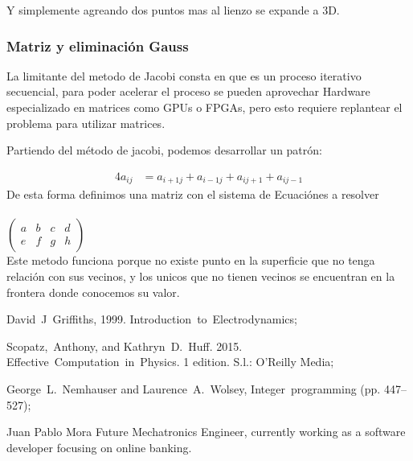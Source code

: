 \documentclass[10pt,journal,compsoc]{IEEEtran}
\begin{document}
Y simplemente agreando dos puntos mas al lienzo se expande a 3D.

\subsubsection{Matriz y eliminación Gauss}

La limitante del metodo de Jacobi consta en que es un proceso iterativo
secuencial, para poder acelerar el proceso se pueden aprovechar Hardware
especializado en matrices como GPUs o FPGAs, pero esto requiere replantear
el problema para utilizar matrices.

Partiendo del método de jacobi, podemos desarrollar un patrón:

\begin{align*}
  4 a_{ij} &= a_{i+1j} + a_{i-1j} + a_{ij+1} + a_{ij-1}
\end{align*}
De esta forma definimos una matriz con el sistema de Ecuaciónes a resolver\\\\
$\begin{pmatrix}
  a & b & c & d\\ 
  e & f & g & h
\end{pmatrix}$ 
\\
Este metodo funciona porque no existe punto en la superficie que no tenga relación
con sus vecinos, y los unicos que no tienen vecinos se encuentran en la frontera
donde conocemos su valor.


\begin{thebibliography}{1}

David~J~Griffiths, 1999. Introduction~to~Electrodynamics;

Scopatz,~Anthony, and Kathryn~D.~Huff. 2015. Effective~Computation~in~Physics. 1 edition. S.l.: O’Reilly Media;

George~L.~Nemhauser and Laurence~A.~Wolsey, Integer~programming (pp. 447–527);
\end{thebibliography}




\begin{IEEEbiographynophoto}{Juan Pablo Mora}
Future Mechatronics Engineer, currently working as a software developer focusing on online banking.
\end{IEEEbiographynophoto}
\end{document}
